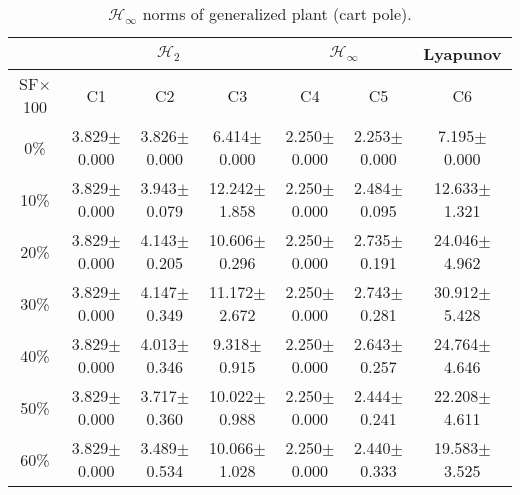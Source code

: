\begin{table}[H]
\centering
\scriptsize
\begin{tabular}{| c || c | c | c | c | c | c |}
	\hline
	 & \multicolumn{3}{c|}{$\mathcal{H}_{2}$} & \multicolumn{2}{c|}{$\mathcal{H}_{\infty}$} & Lyapunov\\
	\hline
	SF$\times$100 & C1& C2 & C3 & C4 & C5 & C6\\
	\hline\hline
	0\% & 3.829$\pm$0.000 & 3.826$\pm$0.000 & 6.414$\pm$0.000 & 2.250$\pm$0.000 & 2.253$\pm$0.000 & 7.195$\pm$0.000\\
	\hline
	10\% & 3.829$\pm$0.000 & 3.943$\pm$0.079 & 12.242$\pm$1.858 & 2.250$\pm$0.000 & 2.484$\pm$0.095 & 12.633$\pm$1.321\\
	\hline
	20\% & 3.829$\pm$0.000 & 4.143$\pm$0.205 & 10.606$\pm$0.296 & 2.250$\pm$0.000 & 2.735$\pm$0.191 & 24.046$\pm$4.962\\
	\hline
	30\% & 3.829$\pm$0.000 & 4.147$\pm$0.349 & 11.172$\pm$2.672 & 2.250$\pm$0.000 & 2.743$\pm$0.281 & 30.912$\pm$5.428\\
	\hline
	40\% & 3.829$\pm$0.000 & 4.013$\pm$0.346 & 9.318$\pm$0.915 & 2.250$\pm$0.000 & 2.643$\pm$0.257 & 24.764$\pm$4.646\\
	\hline
	50\% & 3.829$\pm$0.000 & 3.717$\pm$0.360 & 10.022$\pm$0.988 & 2.250$\pm$0.000 & 2.444$\pm$0.241 & 22.208$\pm$4.611\\
	\hline
	60\% & 3.829$\pm$0.000 & 3.489$\pm$0.534 & 10.066$\pm$1.028 & 2.250$\pm$0.000 & 2.440$\pm$0.333 & 19.583$\pm$3.525\\
	\hline
\end{tabular}
\caption{$\mathcal{H}_{\infty}$ norms of generalized plant (cart pole).}
\label{table:hinfinity_norms_cart_pole:noise}
\end{table}

